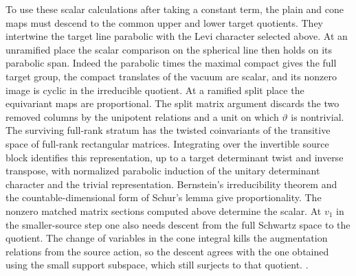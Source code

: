 To use these scalar calculations after taking a constant term, the
plain and cone maps must descend to the common upper and lower
target quotients. They intertwine the target line parabolic with the
Levi character selected above. At an unramified place the scalar
comparison on the spherical line then holds on its parabolic span.
Indeed the parabolic times the maximal compact gives the full target
group, the compact translates of the vacuum are scalar, and its
nonzero image is cyclic in the irreducible quotient. At a ramified
split place the equivariant maps are proportional. The split matrix
argument discards the two removed columns by the unipotent relations
and a unit on which \(\vartheta\) is nontrivial. The surviving
full-rank stratum has the twisted coinvariants of the transitive
space of full-rank rectangular matrices. Integrating over the
invertible source block identifies this representation, up to a
target determinant twist and inverse transpose, with normalized
parabolic induction of the unitary determinant character and the
trivial representation. Bernstein's irreducibility theorem and
the countable-dimensional form of Schur's lemma give proportionality.
The nonzero matched matrix sections computed above determine the
scalar. At \(v_1\) in the smaller-source step one also needs descent
from the full Schwartz space to the quotient. The change of variables
in the cone integral kills the augmentation relations from the
source action, so the descent agrees with the one obtained using the
small support subspace, which still surjects to that quotient.
.

